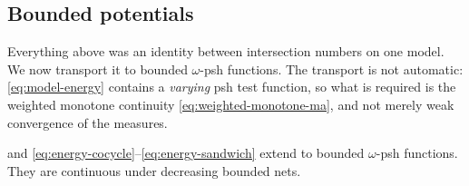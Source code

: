 \subsection{Bounded potentials}
\label{sec:ch26-bounded-energy}

Everything above was an identity between intersection numbers on one model.
We now transport it to bounded \(\omega\)-psh functions.  The transport is
not automatic: \eqref{eq:model-energy} contains a \emph{varying} psh test
function, so what is required is the weighted monotone continuity
\eqref{eq:weighted-monotone-ma}, and not merely weak convergence of the
measures.

\begin{proposition}\label{prop:bounded-energy-identities}
 and
\eqref{eq:energy-cocycle}--\eqref{eq:energy-sandwich} extend to bounded
\(\omega\)-psh functions. They are continuous under decreasing bounded nets.
\end{proposition}

